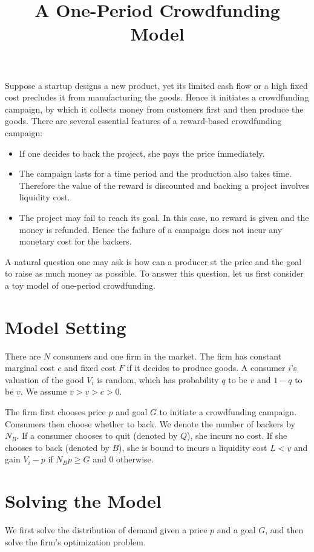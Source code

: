 \documentclass{article}
\title{A One-Period Crowdfunding Model}
\begin{document}
\maketitle
Suppose a startup designs a new product, yet
its limited cash flow or a high fixed cost precludes
it from manufacturing the goods. Hence it initiates
a crowdfunding campaign, by which it collects
money from customers first and then produce the goods.
There are several essential features of a reward-based
crowdfunding campaign:
\begin{itemize}
    \item If one decides to back the project, she pays the
    price immediately. 
    \item The campaign lasts for a time period and the
    production also takes time. Therefore the value
    of the reward is discounted and backing a project
    involves liquidity cost.
    \item The project may fail to reach its goal. In this
    case, no reward is given and the money is refunded.
    Hence the failure of a campaign does not incur
    any monetary cost for the backers.
\end{itemize}

A natural question one may ask is how can a producer st the price
and the goal to raise as much money as possible. To answer
this question, let us first consider a toy model of
one-period crowdfunding.

\section{Model Setting}
There are $N$ consumers and one firm in the market. The firm
has constant marginal cost $c$ and fixed cost $F$ if it decides
to produce goods. A consumer $i$'s valuation of the good $V_i$ is random,
which has probability $q$ to be $\overline{v}$ and $1-q$ to be $\underline{v}$.
We assume $\overline{v} > \underline{v} > c > 0$.

The firm first chooses price $p$ and goal $G$ to initiate a
crowdfunding campaign. Consumers then choose whether to back.
We denote the number of backers by $N_B$.
If a consumer chooses to quit (denoted by $Q$), she incurs no cost.
If she chooses to back (denoted by $B$), she is bound to incurs
a liquidity cost $\underline{L} < \underline{v}$ and
gain $V_i - p$ if $N_B p \geq G$ and $0$ otherwise.
\section{Solving the Model}
We first solve the distribution of demand given a price
$p$ and a goal $G$, and then solve the firm's optimization
problem.
\end{document}
